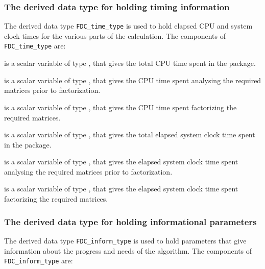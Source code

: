 \documentclass{galahad}
\newcommand{\packagename}{FDC}
\begin{document}
\subsubsection{The derived data type for holding timing
 information}\label{typetime}
The derived data type
{\tt \packagename\_time\_type}
is used to hold elapsed CPU and system clock times for the various parts of
the calculation. The components of
{\tt \packagename\_time\_type}
are:
\begin{description}
 is a scalar variable of type \realdp, that gives
 the total CPU time spent in the package.

 is a scalar variable of type \realdp, that gives
 the CPU time spent analysing the required matrices prior to factorization.

 is a scalar variable of type \realdp, that gives
 the CPU time spent factorizing the required matrices.

 is a scalar variable of type \realdp, that gives
 the total elapsed system clock time spent in the package.

 is a scalar variable of type \realdp, that gives
 the elapsed system clock time spent analysing the required matrices prior to
factorization.

 is a scalar variable of type \realdp, that gives
 the elapsed system clock time spent factorizing the required matrices.

\end{description}


\subsubsection{The derived data type for holding informational
 parameters}\label{typeinform}
The derived data type
{\tt \packagename\_inform\_type}
is used to hold parameters that give information about the progress and needs
of the algorithm. The components of
{\tt \packagename\_inform\_type}
are:
\end{document}
